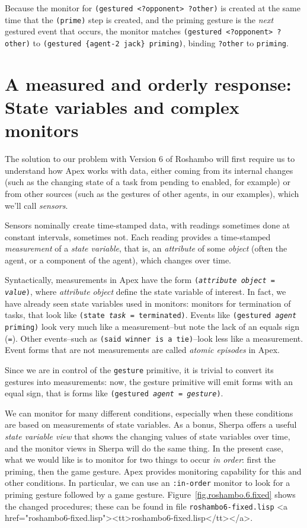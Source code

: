 \documentclass[12pt]{article}
\newcommand{\ic}{\texttt}
\newcommand{\firstref}{\textit}
\newcommand{\fn}[1]{\texonly\texttt{#1}\endtexonly
  \htmlonly \rawhtml <a href="#1"><tt>#1</tt></a>\endrawhtml \endhtmlonly}
\begin{document}
Because the monitor for \ic{(gestured <?opponent> ?other)} is created at the same time that the \ic{(prime)} step is created, and the priming gesture is the \textit{next} gestured event that occurs, the monitor matches  \ic{(gestured <?opponent> ?other)} to \ic{(gestured \{agent-2 jack\} priming)}, binding \ic{?other} to \ic{priming}.

\htmlpagebreak
\section{A measured and orderly response: State variables and complex monitors}

The solution to our problem with Version 6 of Roshambo will first require us to understand how Apex works with data, either coming from its internal changes (such as the changing state of a task from pending to enabled, for example) or from other sources (such as the gestures of other agents, in our examples), which we'll call \firstref{sensors}. 

Sensors nominally create time-stamped data, with readings sometimes
done at constant intervals, sometimes not. Each reading provides a
time-stamped \firstref{measurement} of a \firstref{state variable}, that is, an
\firstref{attribute} of some \firstref{object} (often the agent, or a component
of the agent), which changes over time. 

Syntactically, measurements in Apex have the form \ic{({\it attribute} {\it object} = {\it value})}, where {\it attribute} {\it object} define the state variable of interest. In fact, we have already seen state variables used in monitors: monitors for termination of tasks, that look like \ic{(state {\it task} = terminated)}. Events like \ic{(gestured {\it agent} priming)} look very much like a measurement--but note the lack of an equals sign (\ic{=}). Other events--such as \ic{(said winner is a tie)}--look less like a measurement. Event forms that are not measurements are called \firstref{atomic episodes} in Apex. 

Since we are in control of the \ic{gesture} primitive, it is trivial to convert its gestures into measurements: now, the gesture primitive will emit forms with an equal sign, that is forms like \ic{(gestured {\it agent} = {\it gesture})}.

We can monitor for many different conditions, especially when these conditions are based on measurements of state variables. As a bonus, Sherpa offers a useful \firstref{state variable view} that shows the changing values of state variables over time, and the monitor views in Sherpa will do the same thing. In the present case, what we would like is to monitor for two things to occur \firstref{in order}: first the priming, then the game gesture. Apex provides monitoring capability for this and other conditions. In particular, we can use an \ic{:in-order} monitor to look for a priming gesture followed by a game gesture. Figure~\ref{fig.roshambo.6.fixed} shows the changed procedures; these can be found in file \fn{roshambo6-fixed.lisp}.
\end{document}
